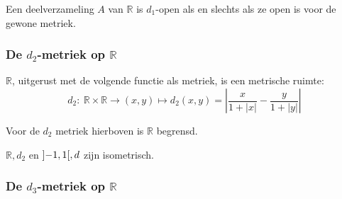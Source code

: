 \documentclass[main.tex]{subfiles}
\begin{document}
\begin{st}
  Een deelverzameling $A$ van $\mathbb{R}$ is $d_{1}$-open als en slechts als ze open is voor de gewone metriek.
\end{st}

\subsubsection{De $d_2$-metriek op $\mathbb{R}$}
\label{sec:d_2-metriek-op}

\begin{vb}
  $\mathbb{R}$, uitgerust met de volgende functie als metriek, is een metrische ruimte:
  \[ d_{2}:\ \mathbb{R}\times\mathbb{R}\rightarrow (x,y) \mapsto d_{2}(x,y)=\left| \frac{x}{1+|x|} - \frac{y}{1+|y|} \right| \]
\end{vb}

\begin{st}
  Voor de $d_{2}$ metriek hierboven is $\mathbb{R}$ begrensd.
\end{st}



\begin{vb}
  $\mathbb{R},d_{2}$ en $\interval[open]{-1}{1},d$ zijn isometrisch.
\end{vb}

\subsubsection{De $d_3$-metriek op $\mathbb{R}$}
\label{sec:d_3-metriek-op}
\end{document}
